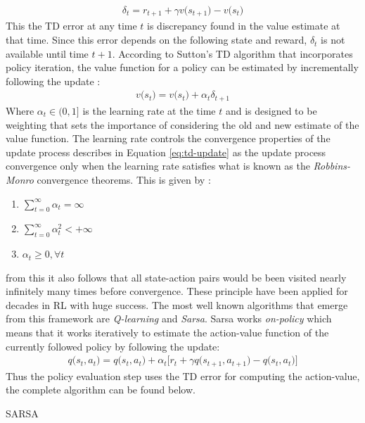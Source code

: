 \documentclass[12pt]{extarticle}
\numberwithin{equation}{section}
\begin{document}
	\begin{align}\label{eq:td-error}
	\delta_{t} = r_{t+1} + \gamma v\big(s_{t+1}\big) - v\big(s_t\big) 
	\end{align}
	This the TD error at any time $t$ is discrepancy found in the value estimate at that time. Since this error depends on the following state and reward, $\delta_{t}$ is not available until time $t+1$. According to Sutton's TD algorithm that incorporates policy iteration, the value function for a policy can be estimated by incrementally following the update\cite{sutton1988TFDearning} :
	\begin{align}\label{eq:td-update}
	v \big(s_t\big) = v\big(s_t\big) + \alpha_t\delta_{t+1}
	\end{align}
	Where $\alpha_t \in (0,1] $ is the learning rate at the time $t$ and is designed to be weighting that sets the importance of considering the old and new estimate of the value function. 
	The learning rate controls the convergence properties of the update process describes in Equation \ref{eq:td-update} as the update process convergence only when the learning rate satisfies what is known as the \textit{Robbins-Monro} convergence theorems. This is given by :
	\begin{enumerate}
		\item $\sum_{t=0}^{\infty}\alpha_t = \infty$
		\item $\sum_{t=0}^{\infty}\alpha_t^2 < +\infty$
		\item $\alpha_t \geq 0, \forall t$
	\end{enumerate}
	from this it also follows that all state-action pairs would be been visited nearly infinitely many times before convergence. These principle have been applied for decades in RL with huge success. The most well known algorithms that emerge from this framework are \textit{Q-learning} and \textit{Sarsa}. 
	Sarsa works \textit{on-policy} which means that it works iteratively to estimate the action-value function of the currently followed policy by following the update:
	\begin{align}\label{eq:sarsa-update}
	q\big(s_t,a_t\big) = q\big(s_t,a_t\big) + \alpha_t\big[r_t + \gamma q\big(s_{t+1},a_{t+1}\big) - q\big(s_t,a_t\big)\big]
	\end{align}
	Thus the policy evaluation step uses the TD error for computing the action-value, the complete algorithm can be found below.
	\begin{algorithm}[h]
		\DontPrintSemicolon
		\SetAlgoLined
		
		\caption{SARSA}\label{alg:sarsa}
	\end{algorithm}
\end{document}

